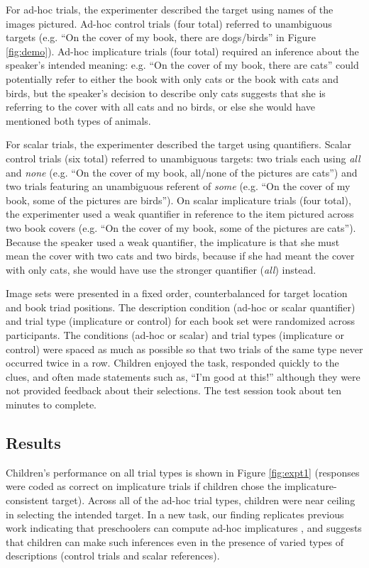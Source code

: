 \documentclass[10pt,letterpaper]{article}
\begin{document}
For ad-hoc trials, the experimenter described the target using names of the images pictured. Ad-hoc control trials (four total) referred to unambiguous targets (e.g. ``On the cover of my book, there are dogs/birds'' in Figure \ref{fig:demo}).  Ad-hoc implicature trials (four total) required an inference about the speaker's intended meaning: e.g. ``On the cover of my book, there are cats'' could potentially refer to either the book with only cats or the book with cats and birds, but the speaker's decision to describe only cats suggests that she is referring to the cover with all cats and no birds, or else she would have mentioned both types of animals. 

For scalar trials, the experimenter described the target using quantifiers. Scalar control trials (six total) referred to unambiguous targets: two trials each using \emph{all} and \emph{none} (e.g. ``On the cover of my book, all/none of the pictures are cats'') and two trials featuring an unambiguous referent of \emph{some} (e.g. ``On the cover of my book, some of the pictures are birds'').  On scalar implicature trials (four total), the experimenter used a weak quantifier in reference to the item pictured across two book covers (e.g. ``On the cover of my book, some of the pictures are cats''). Because the speaker used a weak quantifier, the implicature is that she must mean the cover with two cats and two birds, because if she had meant the cover with only cats, she would have use the stronger quantifier (\emph{all}) instead. 

Image sets were presented in a fixed order, counterbalanced for target location and book triad positions.  The description condition (ad-hoc or scalar quantifier) and trial type (implicature or control) for each book set were randomized across participants. The conditions (ad-hoc or scalar) and trial types (implicature or control) were spaced as much as possible so that two trials of the same type never occurred twice in a row. Children enjoyed the task, responded quickly to the clues, and often made statements such as, ``I'm good at this!'' although they were not provided feedback about their selections. The test session took about ten minutes to complete.

\subsection{Results}

Children's performance on all trial types is shown in Figure \ref{fig:expt1} (responses were coded as correct on implicature trials if children chose the implicature-consistent target). Across all of the ad-hoc trial types, children were near ceiling in selecting the intended target. In a new task, our finding replicates previous work indicating that preschoolers can compute ad-hoc implicatures \citep{stiller2014}, and suggests that children can make such inferences even in the presence of varied types of descriptions (control trials and scalar references). 
\end{document}
